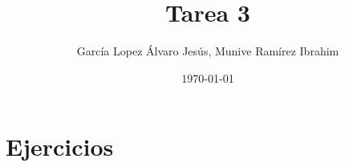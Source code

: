 \documentclass[11pt]{article}
\title{Tarea 3}
\author{García Lopez Álvaro Jesús, Munive Ramírez Ibrahim}
\date{\today}
\begin{document}


\section*{Ejercicios}







% 

% 


% 

% 
\end{document}
